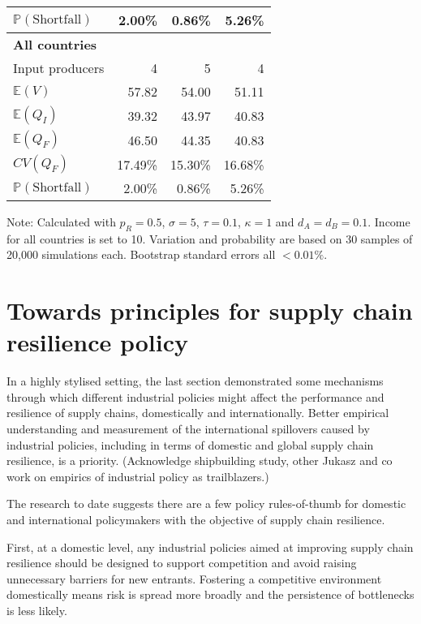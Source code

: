 \documentclass{article}
\begin{document}
\begin{table}
\begin{threeparttable}
\begin{tabular}{lrrr}
            $\mathbb{P}(\text{Shortfall})$ & 2.00\% & 0.86\% & 5.26\% \\ 
            \midrule
            \textbf{All countries} \\
            Input producers & 4 & 5 & 4 \\
            $\mathbb{E}(V)$ & 57.82 & 54.00 & 51.11 \\
            $\mathbb{E}(Q_I)$ & 39.32 & 43.97 & 40.83 \\
            $\mathbb{E}(Q_F)$ & 46.50 & 44.35 & 40.83 \\
            $CV(Q_F)$ & 17.49\% & 15.30\% & 16.68\% \\
            $\mathbb{P}(\text{Shortfall})$ & 2.00\% & 0.86\% & 5.26\% \\ 
            \bottomrule
        \end{tabular}
        \begin{tablenotes}
            \small \item Note: Calculated with $p_R = 0.5$, $\sigma = 5$, $\tau = 0.1$, $\kappa = 1$ and $d_A = d_B = 0.1$. Income for all countries is set to 10. Variation and probability are based on 30 samples of 20,000 simulations each. Bootstrap standard errors all $<0.01\%$.
        \end{tablenotes}
    \end{threeparttable}
\end{table}

\section{Towards principles for supply chain resilience policy}

In a highly stylised setting, the last section demonstrated some mechanisms through which different industrial policies might affect the performance and resilience of supply chains, domestically and internationally. Better empirical understanding and measurement of the international spillovers caused by industrial policies, including in terms of domestic and global supply chain resilience, is a priority. (Acknowledge shipbuilding study, other Jukasz and co work on empirics of industrial policy as trailblazers.) 

The research to date suggests there are a few policy rules-of-thumb for domestic and international policymakers with the objective of supply chain resilience.

First, at a domestic level, any industrial policies aimed at improving supply chain resilience should be designed to support competition and avoid raising unnecessary barriers for new entrants. Fostering a competitive environment domestically means risk is spread more broadly and the persistence of bottlenecks is less likely.
\end{document}
